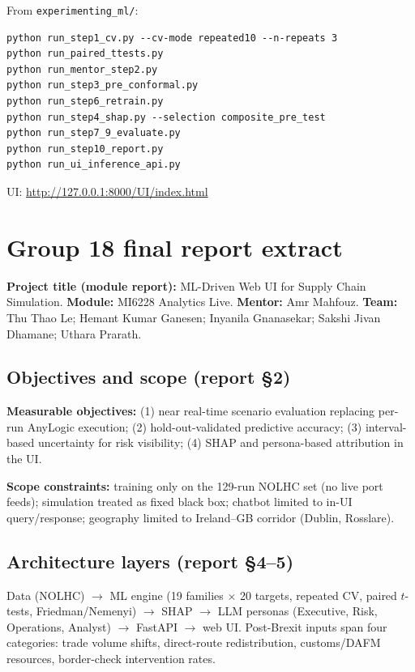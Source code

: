 \documentclass[12pt,twocolumn,a4paper]{article}
\theoremstyle{plain}
\theoremstyle{definition}
\theoremstyle{remark}
\begin{document}
From \texttt{experimenting\_ml/}:
\begin{lstlisting}[basicstyle=\ttfamily\footnotesize, breaklines=true]
python run_step1_cv.py --cv-mode repeated10 --n-repeats 3
python run_paired_ttests.py
python run_mentor_step2.py
python run_step3_pre_conformal.py
python run_step6_retrain.py
python run_step4_shap.py --selection composite_pre_test
python run_step7_9_evaluate.py
python run_step10_report.py
python run_ui_inference_api.py
\end{lstlisting}

UI: \url{http://127.0.0.1:8000/UI/index.html}

\section{Group 18 final report extract}
\label{app:group18}

\textbf{Project title (module report):} ML-Driven Web UI for Supply Chain Simulation.
\textbf{Module:} MI6228 Analytics Live.
\textbf{Mentor:} Amr Mahfouz.
\textbf{Team:} Thu Thao Le; Hemant Kumar Ganesen; Inyanila Gnanasekar; Sakshi Jivan Dhamane; Uthara Prarath.

\subsection{Objectives and scope (report \S2)}

\textbf{Measurable objectives:}
(1) near real-time scenario evaluation replacing per-run AnyLogic execution;
(2) hold-out-validated predictive accuracy;
(3) interval-based uncertainty for risk visibility;
(4) SHAP and persona-based attribution in the UI.

\textbf{Scope constraints:} training only on the 129-run NOLHC set (no live port feeds); simulation treated as fixed black box; chatbot limited to in-UI query/response; geography limited to Ireland--GB corridor (Dublin, Rosslare).

\subsection{Architecture layers (report \S4--5)}

Data (NOLHC) $\rightarrow$ ML engine (19 families $\times$ 20 targets, repeated CV, paired $t$-tests, Friedman/Nemenyi) $\rightarrow$ SHAP $\rightarrow$ LLM personas (Executive, Risk, Operations, Analyst) $\rightarrow$ FastAPI $\rightarrow$ web UI.
Post-Brexit inputs span four categories: trade volume shifts, direct-route redistribution, customs/DAFM resources, border-check intervention rates.
\end{document}
